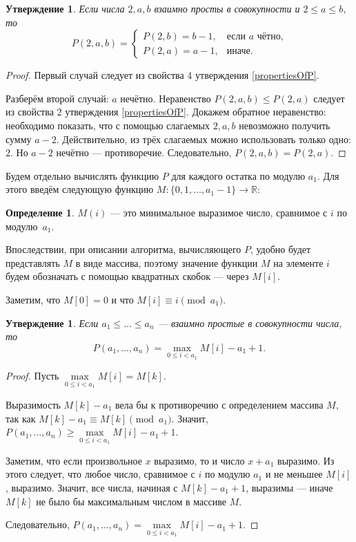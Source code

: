 \documentclass[12pt]{article}
\newtheorem{proposition}[theorem]{Утверждение}
\theoremstyle{definition}
\newtheorem{definition}[theorem]{Определение}
\begin{document}
\begin{proposition}
Если числа $2, a, b$ взаимно просты в совокупности и $2 \le a \le b$, то \begin{equation*}
P(2, a, b) = \begin{cases}
P(2, b) = b - 1, &\text{если $a$ чётно,} \\
P(2, a) = a - 1,&\text{иначе.}
\end{cases}
\end{equation*}

\end{proposition}
\begin{proof}
Первый случай следует из свойства 4 утверждения \ref{propertiesOfP}.

Разберём второй случай: $a$ нечётно. Неравенство $P(2, a, b) \le P(2, a)$ следует из свойства $2$ утверждения \ref{propertiesOfP}. Докажем обратное неравенство: необходимо показать, что с помощью слагаемых $2, a, b$ невозможно получить сумму $a - 2$. Действительно, из трёх слагаемых можно использовать только одно: $2$. Но $a - 2$ нечётно --- противоречие. Следовательно, $P(2, a, b) = P(2, a)$.
\end{proof}

Будем отдельно вычислять функцию $P$ для каждого остатка по модулю $a_1$. Для этого введём следующую функцию $M : \{ 0, 1, \dots, a_1 - 1\} \rightarrow \mathbb{R}$:

\begin{definition}
\label{MDefinition}
$M(i)$ --- это минимальное выразимое число, сравнимое с $i$ по модулю~$a_1$.
\end{definition}

Впоследствии, при описании алгоритма, вычисляющего $P$, удобно будет представлять $M$ в виде массива, поэтому значение функции $M$ на элементе $i$ будем обозначать с помощью квадратных скобок --- через $M[i]$.

Заметим, что $M[0] = 0$ и что $M[i] \equiv i \pmod {a_1}$.

\begin{proposition}
\label{algorithm:lemma1}
Если $a_1 \le \dots \le a_n$ --- взаимно простые в совокупности числа, то \begin{equation*}
P(a_1, \dots, a_n) = \max\limits_{0 \le i < a_1} M[i] - a_1 + 1.
\end{equation*}
\end{proposition}
\begin{proof}
Пусть $\max\limits_{0 \le i < a_1} M[i] = M[k]$.

Выразимость $M[k] - a_1$ вела бы к противоречию с определением массива $M$, так как $M[k] - a_1 \equiv M[k] \pmod {a_1}$. Значит, $P(a_1, \dots, a_n) \ge \max\limits_{0 \le i < a_1} M[i] - a_1 + 1$.

Заметим, что если произвольное $x$ выразимо, то и число $x + a_1$ выразимо. Из этого следует, что любое число, сравнимое с $i$ по модулю $a_1$ и не меньшее $M[i]$, выразимо. Значит, все числа, начиная с $M[k] - a_1 + 1$, выразимы --- иначе $M[k]$ не было бы максимальным числом в массиве $M$.

Следовательно, $P(a_1, \dots, a_n) = \max\limits_{0 \le i < a_1} M[i] - a_1 + 1$.
\end{proof}
\end{document}
